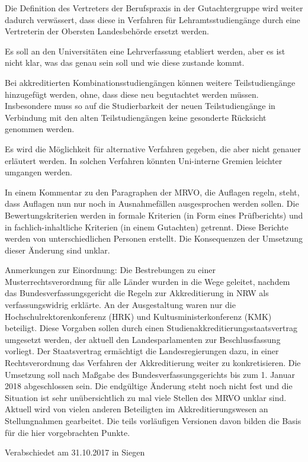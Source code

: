 \documentclass[DIV=calc]{scrartcl}
\begin{document}
\begin{compactitem}
\item Die Definition des Vertreters der Berufspraxis in der Gutachtergruppe wird weiter dadurch verwässert, dass diese in Verfahren für Lehramtsstudiengänge durch eine Vertreterin der Obersten Landesbehörde ersetzt werden.
\item Es soll an den Universitäten eine \glqq Lehrverfassung\grqq{} etabliert werden, aber es ist nicht klar, was das genau sein soll und wie diese zustande kommt.
\item Bei akkreditierten Kombinationsstudiengängen können weitere Teilstudiengänge hinzugefügt werden, ohne, dass diese neu begutachtet werden müssen. Insbesondere muss so auf die Studierbarkeit der neuen Teilstudiengänge in Verbindung mit den alten Teilstudiengängen keine gesonderte Rücksicht genommen werden.
\item Es wird die Möglichkeit für alternative Verfahren gegeben, die aber nicht genauer erläutert werden. In solchen Verfahren könnten Uni-interne Gremien leichter umgangen werden.
\item In einem Kommentar zu den Paragraphen der MRVO, die Auflagen regeln, steht, dass Auflagen nun nur noch in Ausnahmefällen ausgesprochen werden sollen. Die Bewertungskriterien werden in formale Kriterien (in Form eines Prüfberichts) und in fachlich-inhaltliche Kriterien (in einem Gutachten) getrennt. Diese Berichte werden von unterschiedlichen Personen erstellt. Die Konsequenzen der Umsetzung dieser Änderung sind unklar.
\end{compactitem}

Anmerkungen zur Einordnung:
Die Bestrebungen zu einer Musterrechtsverordnung für alle Länder wurden in die Wege geleitet, nachdem das Bundesverfassungsgericht die Regeln zur Akkreditierung in NRW als verfassungswidrig erklärte. An der Ausgestaltung waren nur die Hochschulrektorenkonferenz (HRK) und Kultusministerkonferenz (KMK) beteiligt.
Diese Vorgaben sollen durch einen Studienakkreditierungsstaatsvertrag umgesetzt werden, der aktuell den Landesparlamenten zur Beschlussfassung vorliegt. Der Staatsvertrag ermächtigt die Landesregierungen dazu, in einer Rechtsverordnung das Verfahren der Akkreditierung weiter zu konkretisieren. Die Umsetzung soll nach Maßgabe des Bundesverfassungsgerichts bis zum 1. Januar 2018 abgeschlossen sein. Die endgültige Änderung steht noch nicht fest und die Situation ist sehr unübersichtlich zu mal viele Stellen des MRVO unklar sind.
Aktuell wird von vielen anderen Beteiligten im Akkreditierungswesen an Stellungnahmen gearbeitet. Die teils vorläufigen Versionen davon bilden die Basis für die hier vorgebrachten Punkte.

\vspace{-0.5\baselineskip}
    \begin{flushright}
        Verabschiedet am 31.10.2017 in Siegen
    \end{flushright}
\end{document}
